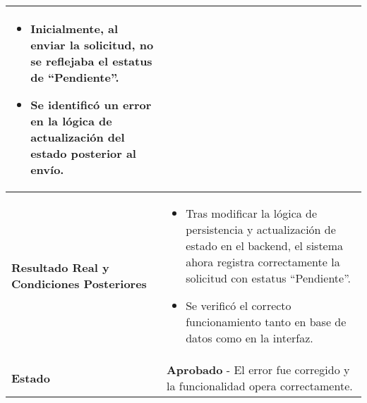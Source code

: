 \begin{longtable}{|p{5cm}|p{10cm}|}
\begin{itemize}
		\item Inicialmente, al enviar la solicitud, no se reflejaba el estatus de “Pendiente”.
		\item Se identificó un error en la lógica de actualización del estado posterior al envío.
	\end{itemize} \\
	\hline
	\textbf{Resultado Real y Condiciones Posteriores} & 
	\begin{itemize}
		\item Tras modificar la lógica de persistencia y actualización de estado en el backend, el sistema ahora registra correctamente la solicitud con estatus “Pendiente”.
		\item Se verificó el correcto funcionamiento tanto en base de datos como en la interfaz.
	\end{itemize} \\
	\hline
	\textbf{Estado} & 
	\textbf{Aprobado} - El error fue corregido y la funcionalidad opera correctamente. \\
	\hline
\end{longtable}
